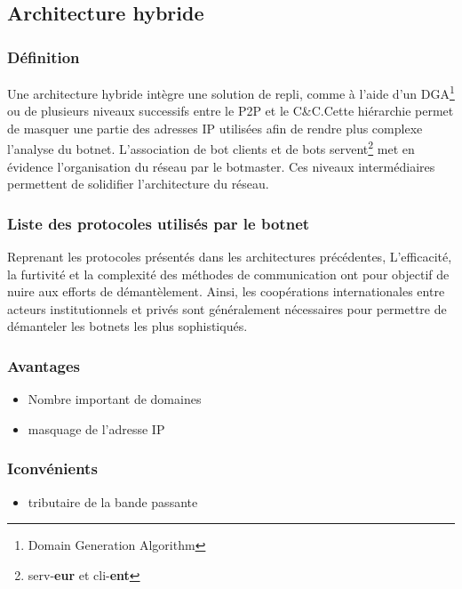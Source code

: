 \subsection{Architecture hybride}


\subsubsection{Définition}
Une architecture hybride intègre une solution de repli, comme à l'aide d'un DGA\footnote{Domain Generation Algorithm} ou de plusieurs niveaux successifs entre le P2P et le C\&C.Cette hiérarchie permet de masquer une partie des adresses IP utilisées afin de rendre plus complexe l'analyse du botnet.
L'association de bot clients et de bots servent\footnote{serv-\textbf{eur} et cli-\textbf{ent}} met en évidence l'organisation du réseau par le botmaster.
Ces niveaux intermédiaires permettent de solidifier l'architecture du réseau.

\subsubsection{Liste des protocoles utilisés par le botnet}
Reprenant les protocoles présentés dans les architectures précédentes, L'efficacité, la furtivité et la complexité des méthodes de communication ont pour objectif de nuire aux efforts de démantèlement.
Ainsi, les coopérations internationales entre acteurs institutionnels et
privés sont généralement nécessaires pour permettre de démanteler les botnets les plus sophistiqués.

\subsubsection{Avantages}
\begin{itemize}
	\item Nombre important de domaines
  \item masquage de l'adresse IP
\end{itemize}

\subsubsection{Iconvénients}
\begin{itemize}
	\item tributaire de la bande passante
\end{itemize}

